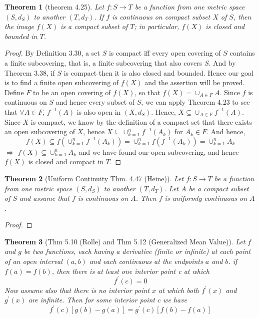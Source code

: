 \documentclass[aps,pra,notitlepage,amsmath,amssymb,letterpaper,12pt]{revtex4-1}
\newtheorem{theorem}{Theorem}
\begin{document}
\begin{theorem}[theorem 4.25]
Let $f:S \to T$  be a function from one metric space $(S,d_{S})$ to another $(T,d_{T})$. If $f$ is continuous on compact subset $X$ of $S$, then the image $f(X)$ is a compact subset of $T$; in particular, $f(X)$ is closed and bounded in $T$.
\end{theorem}
\begin{proof}
By Definition 3.30, a set $S$ is compact iff every open covering of $S$ contains a finite subcovering, that is, a finite subcovering that also covers $S$. And by Theorem 3.38, if $S$ is compact then it is also closed and bounded.
\newline{}
Hence our goal is to find a finite open subcovering of $f(X)$ and the assertion will be proved. Define $F$ to be an open covering of $f(X)$, so that $f(X) = \cup_{A \in F}A$. Since $f$ is continuous on $S$ and hence every subset of $S$, we can apply Theorem 4.23 to see that $\forall A \in F$, $f^{-1}(A)$ is also open in $(X,d_{S})$. Hence, $X \subseteq \cup_{A \in F}f^{-1}(A) $. Since $X$ is compact, we know by the definition of a compact set that there exists an open subcovering of $X$, hence $X \subseteq \cup_{k = 1}^{n}f^{-1}(A_{k}) $ for $A_{k} \in F$. And hence,
$$ f(X) \subseteq f(\cup_{k = 1}^{n}f^{-1}(A_{k})) = \cup_{k = 1}^{n}f(f^{-1}(A_{k})) = \cup_{k = 1}^{n}A_{k} $$
$\Rightarrow$ $f(X) \subseteq\cup_{k = 1}^{n}A_{k}$ and we have found our open subcovering, and hence $f(X)$ is closed and compact in $T$.
\end{proof}


\begin{theorem}[Uniform Continuity Thm. 4.47 (Heine)]
Let $f:S \to T$ be a function from one metric space $(S,d_{S})$ to another $(T,d_{T})$. Let $A$ be a compact subset of $S$ and assume that $f$ is continuous on $A$. Then $f$ is uniformly continuous on $A$.
\end{theorem}

\begin{proof}
\end{proof}


\begin{theorem}[Thm 5.10 (Rolle) and Thm 5.12 (Generalized Mean Value)]
Let $f$ and $g$ be two functions, each having a derivative (finite or infinite) at each point
of an open interval $(a,b)$ and each continuous at the endpoints $a$ and $b$. if $f(a)=f(b)$, then there is at least one interior point c at which
\[f^\prime(c) = 0\]
Now assume also that there is no interior point $x$ at which both $f^\prime(x)$ and $g^\prime(x)$ are infinite. Then for some interior point $c$ we have
\[f^\prime(c)[g(b)-g(a)] = g^\prime(c)[f(b)-f(a)]\]
\end{theorem}
\end{document}
